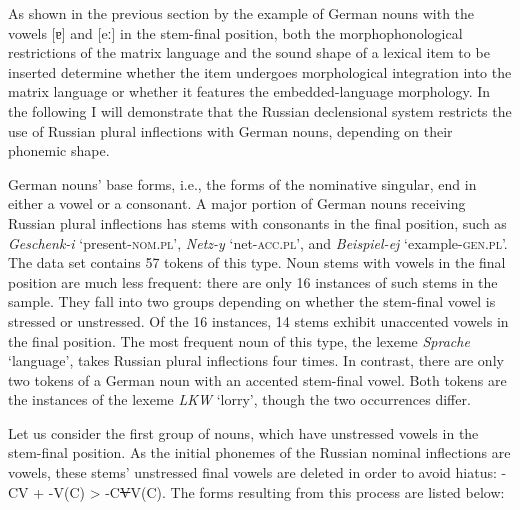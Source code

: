 As shown in the previous section by the example of German nouns with the vowels [ɐ] and [eː] in the stem-final position, both the morphophonological restrictions of the matrix language and the sound shape of a lexical item to be inserted determine whether the item undergoes morphological integration into the matrix language or whether it features the embedded-language morphology. In the following I will demonstrate that the Russian declensional system restricts the use of Russian plural inflections with German nouns, depending on their phonemic shape.

German nouns’ base forms, i.e., the forms of the nominative singular, end in either a vowel or a consonant. A major portion of German nouns receiving Russian plural inflections has stems with consonants in the final position, such as \textit{Geschenk-i} `present-\textsc{nom.pl}', \textit{Netz-y} `net-\textsc{acc.pl}', and \textit{Beispiel-ej} `example-\textsc{gen.pl}'. The data set contains 57 tokens of this type. Noun stems with vowels in the final position are much less frequent: there are only 16 instances of such stems in the sample. They fall into two groups depending on whether the stem-final vowel is  stressed or unstressed. Of the 16 instances, 14 stems exhibit unaccented vowels in the final  position. The most frequent noun of this type, the lexeme \textit{Sprache} `language', takes Russian plural inflections four times. In contrast, there are only two tokens of a German noun with an accented stem-final vowel. Both tokens are the instances of the lexeme \textit{LKW} `lorry', though the two occurrences differ.

Let us consider the first group of nouns, which have unstressed vowels in the stem-final position. As the initial phonemes of the Russian nominal inflections are vowels, these stems’ unstressed final vowels are deleted in order to avoid hiatus: -CV + -V(C) > -C\sout{V}V(C). The forms resulting from this process are listed below:


